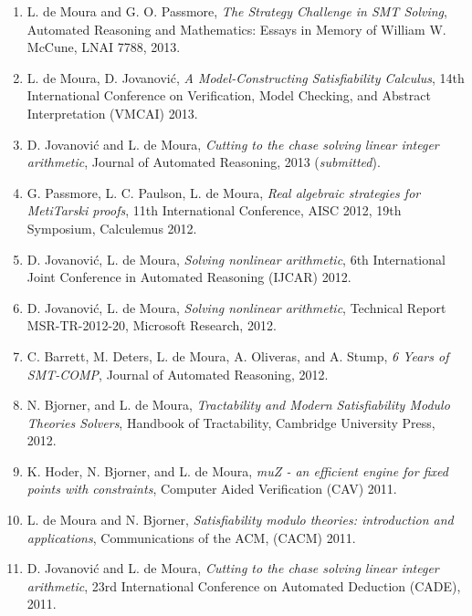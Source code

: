 \documentclass{article}
\begin{document}
\begin{enumerate}
\item L. de Moura and G. O. Passmore,
{\em The Strategy Challenge in SMT Solving},
Automated Reasoning and Mathematics: Essays in Memory of William W. McCune,
LNAI 7788, 2013.

\item L. de Moura, D. Jovanovi\'{c},
      {\em A Model-Constructing Satisfiability Calculus},
14th International Conference on Verification, Model Checking, and Abstract Interpretation (VMCAI) 2013.

\item D. Jovanovi\'{c} and L. de Moura,
      {\em Cutting to the chase solving linear integer arithmetic},
Journal of Automated Reasoning, 2013 ({\em submitted}).

\item G. Passmore, L. C. Paulson, L. de Moura,
{\em Real algebraic strategies for MetiTarski proofs},
11th International Conference, AISC 2012, 19th Symposium, Calculemus 2012.

\item D. Jovanovi\'{c}, L. de Moura,
      {\em Solving nonlinear arithmetic},
6th International Joint Conference in Automated Reasoning (IJCAR) 2012.

\item D. Jovanovi\'{c}, L. de Moura,
      {\em Solving nonlinear arithmetic},
Technical Report MSR-TR-2012-20, Microsoft Research, 2012.

\item C. Barrett, M. Deters, L. de Moura, A. Oliveras, and A. Stump,
      {\em 6 Years of SMT-COMP},
Journal of Automated Reasoning, 2012.

\item N. Bjorner, and L. de Moura,
{\em Tractability and Modern Satisfiability Modulo Theories Solvers},
Handbook of Tractability, Cambridge University Press, 2012.

\item K. Hoder, N. Bjorner, and L. de Moura,
      {\em muZ - an efficient engine for fixed points with constraints},
Computer Aided Verification (CAV) 2011.

\item L. de Moura and N. Bjorner,
      {\em Satisfiability modulo theories: introduction and applications},
Communications of the ACM, (CACM) 2011.

\item D. Jovanovi\'{c} and L. de Moura,
      {\em Cutting to the chase solving linear integer arithmetic},
23rd International Conference on Automated Deduction (CADE), 2011.


\end{enumerate}
\end{document}
